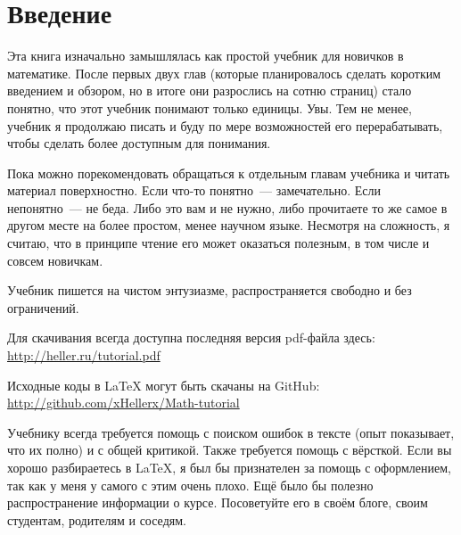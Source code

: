 \chapter*{Введение}

Эта книга изначально замышлялась как простой учебник для новичков в математике. После первых двух глав (которые планировалось сделать коротким введением и обзором, но в итоге они разрослись на сотню страниц) стало понятно, что этот учебник понимают только единицы. Увы. Тем не менее, учебник я продолжаю писать и буду по мере возможностей его перерабатывать, чтобы сделать более доступным для понимания.

Пока можно порекомендовать обращаться к отдельным главам учебника и читать материал поверхностно. Если что-то понятно~--- замечательно. Если непонятно~--- не беда. Либо это вам и не нужно, либо прочитаете то же самое в другом месте на более простом, менее научном языке. Несмотря на сложность, я считаю, что в принципе чтение его может оказаться полезным, в том числе и совсем новичкам.

Учебник пишется на чистом энтузиазме, распространяется свободно и без ограничений.

Для скачивания всегда доступна последняя версия pdf-файла здесь: \url{http://heller.ru/tutorial.pdf}

Исходные коды в \LaTeX{} могут быть скачаны на GitHub: \linebreak
\url{http://github.com/xHellerx/Math-tutorial}

Учебнику всегда требуется помощь с поиском ошибок в тексте (опыт показывает, что их полно) и с общей критикой. Также требуется помощь с вёрсткой. Если вы хорошо разбираетесь в \LaTeX, я был бы признателен за помощь с оформлением, так как у меня у самого с этим очень плохо. Ещё было бы полезно распространение информации о курсе. Посоветуйте его в своём блоге, своим студентам, родителям и соседям.
